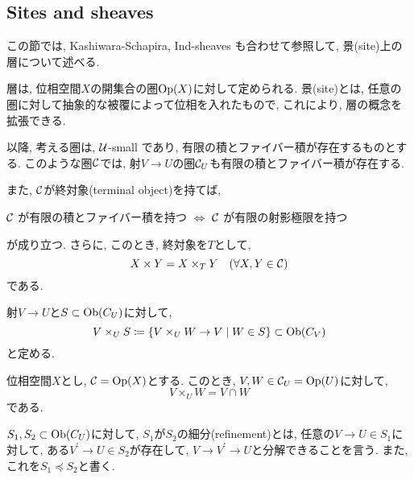 \documentclass[../main]{subfiles}
\begin{document}
\setcounter{section}{1}
\setcounter{subsection}{1} \addtocounter{subsection}{-1}
\subsection{Sites and sheaves}
この節では,
Kashiwara-Schapira, Ind-sheaves \cite{book:KS_ind}
も合わせて参照して,
景(site)上の層について述べる.

\vspace{0.5em}
層は, 位相空間$X$の開集合の圏$\mathrm{Op}(X)$に対して定められる.
景(site)とは, 任意の圏に対して抽象的な被覆によって位相を入れたもので,
これにより, 層の概念を拡張できる.

以降, 考える圏は, $\mathcal{U}$-small であり,
有限の積とファイバー積が存在するものとする.
このような圏$\mathcal{C}$では,
射$V\to U$の圏$\mathcal{C}_U$も有限の積とファイバー積が存在する.

また, $\mathcal{C}$が終対象(terminal object)を持てば,
\begin{center}
  $\mathcal{C}$ が有限の積とファイバー積を持つ
  $\iff$
  $\mathcal{C}$ が有限の射影極限を持つ
\end{center}
が成り立つ.
さらに, このとき, 終対象を$T$として,
\[
  X\times Y = X\times_T Y \hspace{1em} (\forall X, Y\in \mathcal{C})
\]
である.

\begin{sym*}
  射$V\to U$と$S\subset \mathrm{Ob}(C_U)$に対して,
  \[
    V\times_U S
    \coloneqq
    \left\{
      V \times_U W \to V
      \mathrel{}\middle|\mathrel{}
      W\in S
      \right\} \subset \mathrm{Ob}(C_V)
  \]
  と定める.
\end{sym*}

\begin{rem*}
  位相空間$X$とし, $\mathcal{C} = \mathrm{Op}(X)$とする.
  このとき,
  $V,W\in\mathcal{C}_U = \mathrm{Op}(U)$に対して,
  \[
    V\times_U W = V\cap W
  \]
  である.
\end{rem*}

\begin{dfn}
  $S_1,S_2\subset \mathrm{Ob}(C_U)$に対して,
  $S_1$が$S_2$の細分(refinement)とは,
  任意の$V\to U \in S_1$に対して,
  ある$V^\prime\to U\in S_2$が存在して,
  $V\to V^\prime \to U$と分解できることを言う.
  また, これを$S_1 \preceq S_2$と書く.
\end{dfn}
\end{document}
